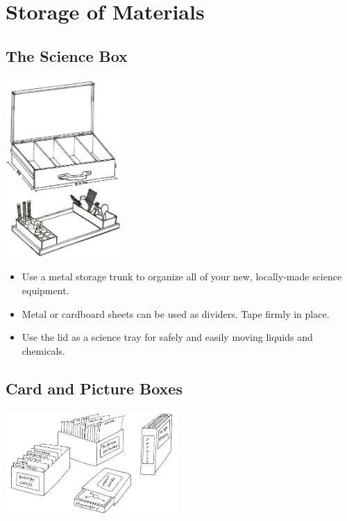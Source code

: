 \chapter{Storage of Materials}

\begin{multicols}{2}

\section{The Science Box}

\begin{center}
\includegraphics[width=0.33\textwidth]{./img/source/science-box-alt.jpg}
\end{center}

\begin{itemize}
\item Use a metal storage trunk to organize all of your new, locally-made science equipment.
\item Metal or cardboard sheets can be used as dividers. Tape firmly in place.
\item Use the lid as a science tray for safely and easily moving liquids and chemicals.
\end{itemize}


\section{Card and Picture Boxes}

\begin{center}
\includegraphics[width=0.49\textwidth]{./img/vso/card-boxes.jpg}
\end{center}


\end{multicols}
